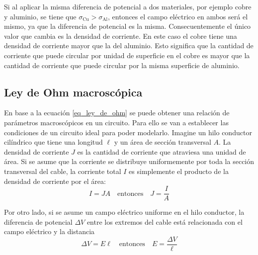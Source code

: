 Si al aplicar la misma diferencia de potencial a dos materiales, por ejemplo cobre y aluminio, se tiene que \(\sigma_\text{Cu}>\sigma_\text{Al}\), entonces el campo eléctrico en ambos será el mismo, ya que la diferencia de potencial es la misma. Consecuentemente el único valor que cambia es la densidad de corriente. En este caso el cobre tiene una densidad de corriente mayor que la del aluminio. Esto significa que la cantidad de corriente que puede circular por unidad de superficie en el cobre es mayor que la cantidad de corriente que puede circular por la misma superficie de aluminio.

\subsection{Ley de Ohm macroscópica}

En base a la ecuación \eqref{eq_ley_de_ohm} se puede obtener una relación de parámetros macroscópicos en un circuito. Para ello se van a establecer las condiciones de un circuito ideal para poder modelarlo. Imagine un hilo conductor cilíndrico que tiene una longitud \(\ell\) y un área de sección transversal \(A\). La densidad de corriente \(J\) es la cantidad de corriente que atraviesa una unidad de área. Si se asume que la corriente se distribuye uniformemente por toda la sección transversal del cable, la corriente total \(I\) es simplemente el producto de la densidad de corriente por el área:
\[
  I=JA \quad \text{entonces} \quad J=\frac{I}{A}
\]

Por otro lado, si se asume un campo eléctrico uniforme en el hilo conductor, la diferencia de potencial \(\Delta V\) entre los extremos del cable está relacionada con el campo eléctrico y la distancia 
\[
  \Delta V = E\ell \quad \text{entonces} \quad E = \frac{\Delta V}{\ell}
\]


